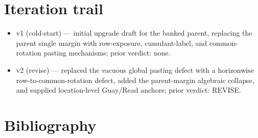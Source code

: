 \documentclass[11pt]{article}
\theoremstyle{definition}
\theoremstyle{plain}
\theoremstyle{remark}
\begin{document}
\section{Iteration trail}
\begin{itemize}[leftmargin=*]
\item v1 (cold-start) --- initial upgrade draft for the banked parent, replacing the parent single margin with row-exposure, cumulant-label, and common-rotation pasting mechanisms; prior verdict: none.
\item v2 (revise) --- replaced the vacuous global pasting defect with a horizonwise row-to-common-rotation defect, added the parent-margin algebraic collapse, and supplied location-level Guay/Read anchors; prior verdict: REVISE.
\end{itemize}

\section*{Bibliography}
\end{document}
